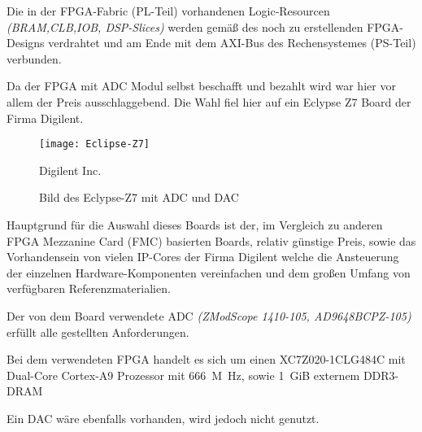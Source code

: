 Die in der \acs{FPGA}-Fabric (PL-Teil) vorhandenen Logic-Resourcen \textit{(\acs{BRAM},\acs{CLB},\acs{IOB}, \acs{DSP}-Slices)} werden gemäß des noch zu erstellenden \acs{FPGA}-Designs verdrahtet
und am Ende mit dem \acs{AXI}-Bus des Rechensystemes (PS-Teil) verbunden. 

Da der \acs{FPGA} mit \acs{ADC} Modul selbst beschafft und bezahlt wird war hier vor allem der Preis ausschlaggebend.
Die Wahl fiel hier auf ein Eclypse Z7 Board der Firma Digilent.

\begin{figure}[h]
	\centering
	\texttt{[image: Eclipse-Z7]}
	\caption{Bild des Eclypse-Z7 mit ADC und DAC} \faCopyright Digilent Inc. \cite{DIG_EZ7_REF}
\end{figure}

Hauptgrund für die Auswahl dieses Boards ist der, im Vergleich zu anderen FPGA Mezzanine Card (FMC) basierten Boards, relativ günstige Preis, sowie das Vorhandensein von
vielen IP-Cores der Firma Digilent welche die Ansteuerung der einzelnen Hardware-Komponenten vereinfachen und dem großen Umfang von verfügbaren Referenzmaterialien.

Der von dem Board verwendete \acs{ADC} \textit{(ZModScope 1410-105, AD9648BCPZ-105)} erfüllt alle gestellten Anforderungen.\cite{DIG_EZ7_ADC_REF}

Bei dem verwendeten \acs{FPGA} handelt es sich um einen XC7Z020-1CLG484C mit Dual-Core Cortex-A9 Prozessor mit \qty{666}{M\hertz}, sowie \qty{1}{GiB} externem DDR3-DRAM\cite{DIG_EZ7_REF}

Ein DAC wäre ebenfalls vorhanden, wird jedoch nicht genutzt.

